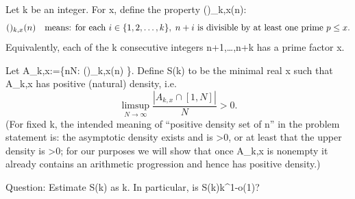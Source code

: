 Let k be an integer.
For x, define the property (\*)_{k,x}(n):
\[(\*)_{k,x}(n)\quad\text{means: for each } i\in\{1,2,\dots,k\},\; n+i \text{ is divisible by at least one prime } p\le x.\]
Equivalently, each of the k consecutive integers n+1,\dots,n+k has a prime factor \le x.

Let A_{k,x}:=\{n\in\mathbb N: (\*)_{k,x}(n) \}.
Define S(k) to be the minimal real x such that A_{k,x} has positive (natural) density, i.e.
\[ \limsup_{N\to\infty} \frac{|A_{k,x}\cap[1,N]|}{N} > 0. \]
(For fixed k, the intended meaning of “positive density set of n” in the problem statement is: the asymptotic density exists and is >0, or at least that the upper density is >0; for our purposes we will show that once A_{k,x} is nonempty it already contains an arithmetic progression and hence has positive density.)

Question: Estimate S(k) as k\to\infty. In particular, is S(k)\ge k^{1-o(1)}?
